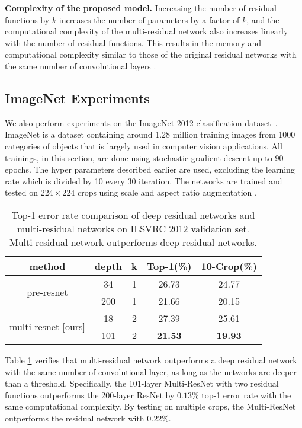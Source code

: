 \documentclass[journal]{IEEEtran}
\begin{document}
\textbf{Complexity of the proposed model.} Increasing the number of residual functions by $k$ increases the number of parameters by a factor of $k$, and  the computational complexity of the multi-residual network also increases linearly with the number of residual functions. This results in the memory and computational complexity similar to those of the original residual networks with the same number of convolutional layers \cite{he2016identity}.


\subsection{ImageNet Experiments}

We also perform experiments on the ImageNet 2012 classification dataset~\cite{ILSVRC15}. ImageNet is a dataset containing around 1.28 million training images from 1000 categories of objects that is largely used in computer vision applications. All trainings, in this section, are done using stochastic gradient descent up to 90 epochs. The hyper parameters described earlier are used, excluding the learning rate which is divided by 10 every 30 iteration. The networks are trained and tested on $224\times 224$ crops using scale and aspect ratio augmentation \cite{he2016identity,szegedy2015going}.%


\begin{table}[!htb]
\centering
\begin{tabular}{||c c c c c ||} 
\hline
method & depth & k & Top-1(\%) & 10-Crop(\%)   \\ 
\hline\hline
\multirow{2}{4.9em}{pre-resnet \cite{he2016identity}} 
& 34 & 1& 26.73 & 24.77 \\ 
& 200 & 1& 21.66 & 20.15 \\ 
\hline
\multirow{2}{4.9em}{multi-resnet [ours]} 
& 18 & 2& 27.39 & 25.61 \\ 
& 101 & 2& \textbf{21.53} & \textbf{19.93}  \\ 
\hline

\end{tabular}
\caption{Top-1 error rate comparison of deep residual networks and multi-residual networks on ILSVRC 2012 validation set. Multi-residual network outperforms deep residual networks.}
\label{table:img}
\end{table}

Table \ref{table:img} verifies that multi-residual network outperforms a deep residual network with the same number of convolutional layer, as long as the networks are deeper than a threshold. Specifically, the 101-layer Multi-ResNet with two residual functions outperforms the 200-layer ResNet by $0.13\%$ top-1 error rate with the same computational complexity. By testing on multiple crops, the Multi-ResNet outperforms the residual network with $0.22\%$.%
\end{document}
